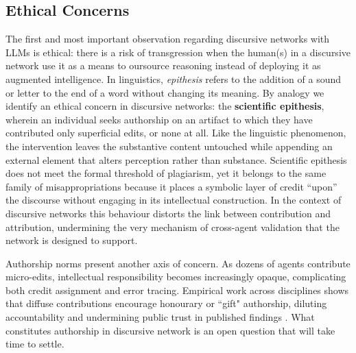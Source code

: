 \documentclass[12pt]{article}
\theoremstyle{definition}
\begin{document}
\subsection{Ethical Concerns}
\label{sec:ethics}
The first and most important observation regarding discursive networks with LLMs is ethical: there is a risk of transgression when the human(s) in a discursive network use it as a means to oursource reasoning instead of deploying it as augmented intelligence. 
In linguistics, \emph{epithesis} refers to the addition of a sound or
letter to the end of a word without changing its meaning.  By analogy we
identify an ethical concern in discursive networks: the \textbf{scientific
epithesis}, wherein an individual seeks authorship on an artifact to
which they have contributed only superficial edits, or none at all.
Like the linguistic phenomenon, the intervention leaves the substantive
content untouched while appending an external element that alters
perception rather than substance.  Scientific epithesis does not meet
the formal threshold of plagiarism, yet it belongs to the same family of
misappropriations because it places a symbolic layer of credit ``upon''
the discourse without engaging in its intellectual construction.  In the
context of discursive networks this behaviour distorts the link between
contribution and attribution, undermining the very mechanism of
cross-agent validation that the network is designed to support.

Authorship norms present another axis of concern.  As dozens of agents
contribute micro-edits, intellectual responsibility becomes
increasingly opaque, complicating both credit assignment and error
tracing.  Empirical work across disciplines shows that diffuse
contributions encourage honourary or ``gift" authorship, diluting
accountability and undermining public trust in published findings
\cite{maruvsic2011systematic}. What constitutes authorship in discursive network is an open question that will take time to settle.  
\end{document}
